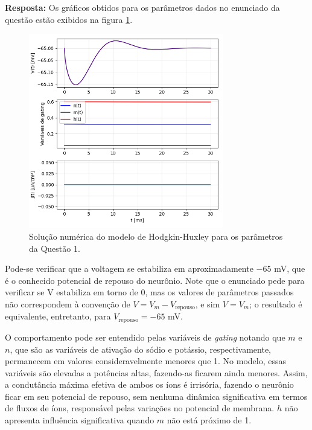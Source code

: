 \documentclass[english,11pt,a4paper]{article}
\begin{document}
	\noindent \textbf{Resposta:} Os gráficos obtidos para os parâmetros dados no enunciado da questão estão exibidos na figura \ref{fig1}.
	
	\begin{figure}[H]
		\centering
		\includegraphics[width=8.5cm]{../figures/ex_1.png}
		\caption{Solução numérica do modelo de Hodgkin-Huxley para os parâmetros da Questão 1.}
		\label{fig1}
	\end{figure}
	
	Pode-se verificar que a voltagem se estabiliza em aproximadamente $-65$ mV, que é o conhecido potencial de repouso do neurônio. Note que o enunciado pede para verificar se V estabiliza em torno de 0, mas os valores de parâmetros passados não correspondem à convenção de $V = V_m - V_\text{repouso}$, e sim $V = V_m$; o resultado é equivalente, entretanto, para  $V_\text{repouso} = -65$ mV.
	
	O comportamento pode ser entendido pelas variáveis de \textit{gating} notando que $m$ e $n$, que são as variáveis de ativação do sódio e potássio, respectivamente, permanecem em valores consideravelmente menores que 1. No modelo, essas variáveis são elevadas a potências altas, fazendo-as ficarem ainda menores. Assim, a condutância máxima efetiva de ambos os íons é irrisória, fazendo o neurônio ficar em seu potencial de repouso, sem nenhuma dinâmica significativa em termos de fluxos de íons, responsável pelas variações no potencial de membrana. $h$ não apresenta influência significativa quando $m$ não está próximo de 1.
	\\\\
	
\end{document}
